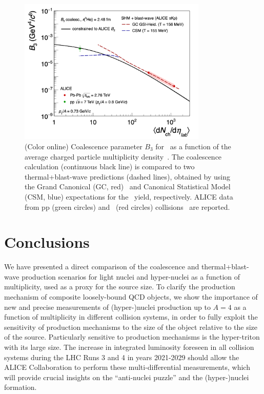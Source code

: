 \documentclass[a4paper,11pt]{article}
\begin{document}
\begin{figure}[!htb]
\begin{center}
\includegraphics[width=0.8\textwidth]{B3vsMult073.png}
\caption{(Color online) Coalescence parameter $B_3$ for \hethree~as a function of the average charged particle multiplicity density~\avdNdeta. The coalescence calculation (continuous black line) is compared to two thermal+blast-wave predictions (dashed lines), obtained by using the Grand Canonical (GC, red)~\cite{Andronic:2017} and Canonical Statistical Model (CSM, blue) \cite{Vovchenko:2018fiy} expectations for the \hethree~yield, respectively. ALICE data from pp (green circles) and \PbPb~(red circles) collisions~\cite{ALICE:nucleipp2017,ALICE:deuteronppPbPb2015} are reported. }
\label{Fig:3He}
\end{center}
\end{figure} 

\section{Conclusions}
We have presented a direct comparison of the coalescence and ther\-mal+blast-wa\-ve production scenarios for light nuclei and hyper-nuclei as a function of multiplicity, used as a proxy for the source size. 
To clarify the production mechanism of composite loosely-bound QCD objects, we show the importance of new and precise measurements of (hyper-)nuclei production up to $A=4$ as a function of multiplicity in different collision systems, in order to fully exploit the sensitivity of production mechanisms to the size of the object relative to the size of the source.
Particularly sensitive to production mechanisms is the hyper-triton with its large size. 
The increase in integrated luminosity foreseen in all collision systems during the LHC Runs 3 and 4 in years 2021-2029 should allow the ALICE Collaboration to perform these multi-differential measurements, which will provide crucial insights on the ``anti-nuclei puzzle'' and the (hyper-)nuclei formation.

 	

\end{document}
